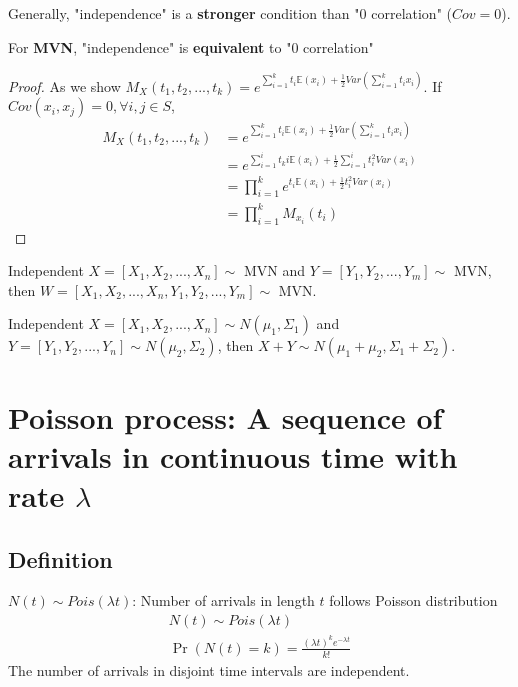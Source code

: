\documentclass[11pt]{elegantbook}
\begin{document}
Generally, "independence" is a \textbf{stronger} condition than "$0$ correlation" ($Cov=0$).
\begin{theorem}
    For \textbf{MVN}, "independence" is \textbf{equivalent} to "$0$ correlation"
\end{theorem}
\begin{proof}
As we show $M_X(t_1,t_2,...,t_k)=e^{\sum_{i=1}^kt_i \mathbb{E}(x_i)+\frac{1}{2}Var(\sum_{i=1}^k t_ix_i)}$. If $Cov(x_i,x_j)=0,\forall i,j\in S$,
\begin{equation}
    \begin{aligned}
        M_X(t_1,t_2,...,t_k)&=e^{\sum_{i=1}^kt_i \mathbb{E}(x_i)+\frac{1}{2}Var(\sum_{i=1}^k t_ix_i)}\\
        &=e^{\sum_{i=1}^it_ki \mathbb{E}(x_i)+\frac{1}{2}\sum_{i=1}^it_i^2Var(x_i)}\\
        &=\prod_{i=1}^ke^{t_i\mathbb{E}(x_i)+\frac{1}{2}t_i^2Var(x_i)}\\
        &=\prod_{i=1}^kM_{x_i}(t_i)
    \end{aligned}
    \nonumber
\end{equation}
\end{proof}

\begin{theorem}
    Independent $X=[X_1,X_2,...,X_n]\sim$ MVN and $Y=[Y_1,Y_2,...,Y_m]\sim$ MVN, then $W=[X_1,X_2,...,X_n,Y_1,Y_2,...,Y_m]\sim$ MVN.
\end{theorem}

\begin{theorem}
    Independent $X=[X_1,X_2,...,X_n]\sim N(\mu_1,\Sigma_1)$ and $Y=[Y_1,Y_2,...,Y_n]\sim N(\mu_2,\Sigma_2)$, then $X+Y\sim N(\mu_1+\mu_2,\Sigma_1+\Sigma_2)$.
\end{theorem}














\section{Poisson process: A sequence of arrivals in continuous time with rate $\lambda$}
\subsection{Definition}
$N(t)\sim Pois(\lambda t)$: Number of arrivals in length $t$ follows Poisson distribution
\begin{equation}
    \begin{aligned}
        N(t)\sim Pois(\lambda t)\\
        \Pr(N(t)=k)=\frac{(\lambda t)^k e^{-\lambda t}}{k!}
    \end{aligned}
    \nonumber
\end{equation}
The number of arrivals in disjoint time intervals are independent.
\end{document}
